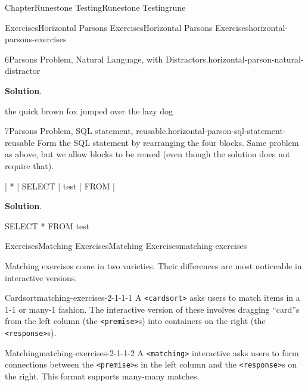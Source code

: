 \documentclass[oneside,10pt,]{book}
\newcommand{\blocktitlefont}{\relax}
\newcommand{\mono}[1]{\texttt{#1}}
\numberwithin{equation}{section}
\begin{document}
\begin{chapterptx}{Chapter}{Runestone Testing}{}{Runestone Testing}{}{}{rune}
\begin{exercises-section}{Exercises}{Horizontal Parsons Exercises}{}{Horizontal Parsons Exercises}{}{}{horizontal-parsons-exercises}
\begin{divisionexercise}{6}{Parsons Problem, Natural Language, with Distractors.}{}{horizontal-parson-natural-distractor}
\begin{codedisplay}
\end{codedisplay}
%
\par\smallskip%
\noindent\textbf{\blocktitlefont Solution}.\hypertarget{horizontal-parson-natural-distractor-3}{}\quad{}%
\begin{codedisplay}
the quick brown fox jumped over the lazy dog
\end{codedisplay}
%
\end{divisionexercise}%
\begin{divisionexercise}{7}{Parsons Problem, SQL statement, reusable.}{}{horizontal-parson-sql-statement-reusable}%
Form the SQL statement by rearranging the four blocks.  Same problem as above, but we allow blocks to be reused (even though the solution does not require that).%
\par
%
\begin{codedisplay}
 | * | SELECT | test | FROM | 
\end{codedisplay}
%
\par\smallskip%
\noindent\textbf{\blocktitlefont Solution}.\hypertarget{horizontal-parson-sql-statement-reusable-3}{}\quad{}%
\begin{codedisplay}
SELECT * FROM test
\end{codedisplay}
%
\end{divisionexercise}%
\end{exercises-section}
%
%
\typeout{************************************************}
\typeout{************************************************}
%
\begin{exercises-section}{Exercises}{Matching Exercises}{}{Matching Exercises}{}{}{matching-exercises}
\begin{introduction}{}%
Matching exercises come in two varieties. Their differences are most noticeable in interactive versions.%
\begin{descriptionlist}
\begin{dlimedium}{Cardsort}{matching-exercises-2-1-1-1}%
A \mono{<cardsort>} asks users to match items in a 1-1 or many-1 fashion. The interactive version of these involves dragging ``card''s from the left column (the \mono{<premise>}s) into containers on the right (the \mono{<response>}s).%
\end{dlimedium}%
\begin{dlimedium}{Matching}{matching-exercises-2-1-1-2}%
A \mono{<matching>} interactive asks users to form connections between the \mono{<premise>}s in the left column and the \mono{<response>}s on the right. This format supports many-many matches.%

\end{dlimedium}
\end{descriptionlist}
\end{introduction}
\end{exercises-section}
\end{chapterptx}
\end{document}
